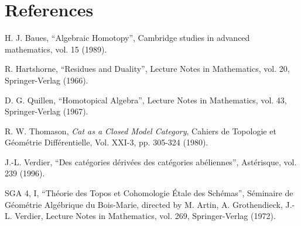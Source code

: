 \documentclass[11pt]{article}
\newcommand{\printedpage}[1]{\marginpar{\footnotesize p.~#1}}
\begin{document}
\printedpage{64}

\section*{References}

\noindent H. J. Baues, ``Algebraic Homotopy'', Cambridge studies in advanced mathematics, vol. 15 (1989).

\noindent R. Hartshorne, ``Residues and Duality'', Lecture Notes in Mathematics, vol. 20, Springer-Verlag (1966).

\noindent D. G. Quillen, ``Homotopical Algebra'', Lecture Notes in Mathematics, vol. 43, Springer-Verlag (1967).

\noindent R. W. Thomason, \textit{Cat as a Closed Model Category}, Cahiers de Topologie et Géométrie Différentielle, Vol. XXI-3, pp. 305-324 (1980).

\noindent J.-L. Verdier, ``Des catégories dérivées des catégories abéliennes'', Astérisque, vol. 239 (1996).

\noindent SGA 4, I, ``Théorie des Topos et Cohomologie Étale des Schémas'', Séminaire de Géométrie Algébrique du Bois-Marie, directed by M. Artin, A. Grothendieck, J.-L. Verdier, Lecture Notes in Mathematics, vol. 269, Springer-Verlag (1972).
\end{document}
